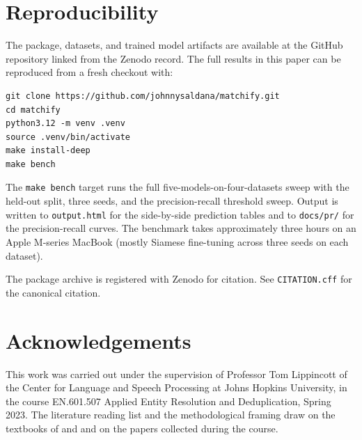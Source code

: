 \documentclass[10pt,letterpaper]{article}
\begin{document}
\section{Reproducibility}
\label{sec:reproducibility}

The package, datasets, and trained model artifacts are available at
the GitHub repository linked from the Zenodo record. The full results
in this paper can be reproduced from a fresh checkout with:

\begin{verbatim}
git clone https://github.com/johnnysaldana/matchify.git
cd matchify
python3.12 -m venv .venv
source .venv/bin/activate
make install-deep
make bench
\end{verbatim}

The \texttt{make bench} target runs the full
five-models-on-four-datasets sweep with the held-out split, three
seeds, and the precision-recall threshold sweep. Output is written to
\texttt{output.html} for the side-by-side prediction tables and to
\texttt{docs/pr/} for the precision-recall curves. The benchmark takes
approximately three hours on an Apple M-series MacBook (mostly
Siamese fine-tuning across three seeds on each dataset).

The package archive is registered with Zenodo for citation. See
\texttt{CITATION.cff} for the canonical citation.

\section*{Acknowledgements}

This work was carried out under the supervision of Professor Tom Lippincott
of the Center for Language and Speech Processing at Johns Hopkins
University, in the course EN.601.507 Applied Entity Resolution and
Deduplication, Spring 2023. The literature reading list and the
methodological framing draw on the textbooks of \citet{christen2012}
and \citet{papadakis2021} and on the papers collected during the
course.



\end{document}
